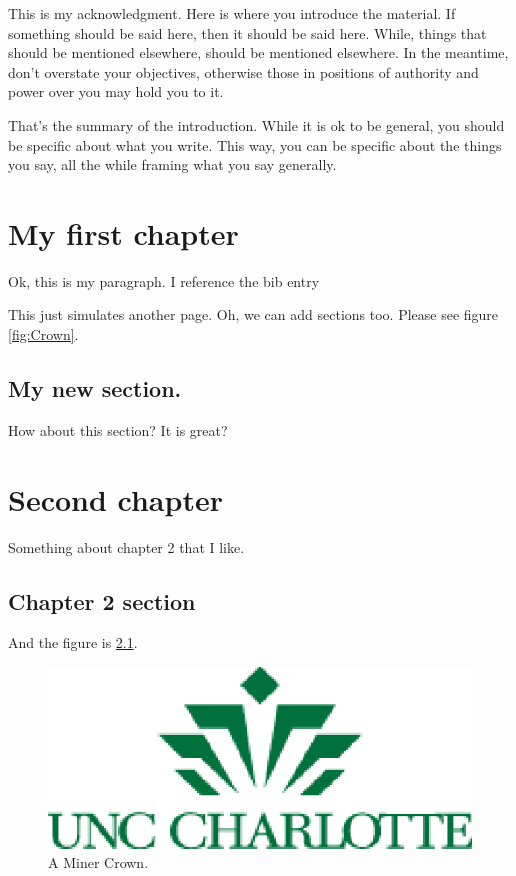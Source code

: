 \documentclass[12pt]{report}
\begin{document}
\acknowledgments
This is my acknowledgment.
\introduction
Here is where you introduce the material.  If something should be said
here, then it should be said here.  While, things that should be mentioned
elsewhere, should be mentioned elsewhere.  In the meantime, don't overstate your
objectives, otherwise those in positions of authority and power over you may hold
you to it.

That's the summary of the introduction.  While it is ok to be general, you should
be specific about what you write.  This way, you can be specific about the things
you say, all the while framing what you say generally.

%

\clearpage
\tableofcontents
\clearpage
\listoftables
\clearpage
\listoffigures

\pagebreak{}



\chapter{My first chapter}
Ok, this is my paragraph.  I reference the bib entry\cite{key-2}

\pagebreak{}

This just simulates another page.  Oh, we can add sections too.
Please see figure \ref{fig:Crown}.
\section{My new section.}
How about this section?  It is great?

\chapter{Second chapter}
Something about chapter 2 that I like.
\section{Chapter 2 section}
And the figure is \ref{fig:two}.
\begin{figure}
\begin{centering}
\includegraphics[scale=0.5]{UNCClogo.eps}
\par\end{centering}

\caption{\label{fig:two}A Miner Crown.}

\end{figure}
\end{document}
